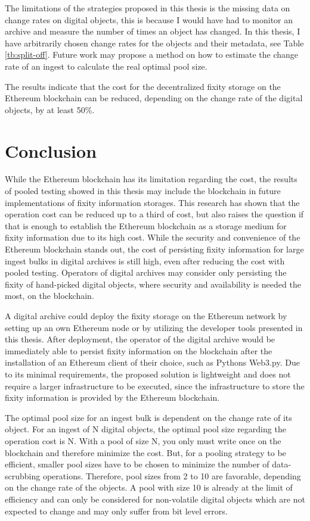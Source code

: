\documentclass[final]{vutinfth}
\begin{document}
The limitations of the strategies proposed in this thesis is the missing data on change rates on digital objects, this is because I would have had to monitor an archive and measure the number of times an object has changed. In this thesis, I have arbitrarily chosen change rates for the objects and their metadata, see Table \ref{tb:split-off}. Future work may propose a method on how to estimate the change rate of an ingest to calculate the real optimal pool size.

The results indicate that the cost for the decentralized fixity storage on the Ethereum blockchain can be reduced, depending on the change rate of the digital objects, by at least 50\%. \chapter{Conclusion}
While the Ethereum blockchain has its limitation regarding the cost, the results of pooled testing showed in this thesis may include the blockchain in future implementations of fixity information storages. This research has shown that the operation cost can be reduced up to a third of cost, but also raises the question if that is enough to establish the Ethereum blockchain as a storage medium for fixity information due to its high cost. While the security and convenience of the Ethereum blockchain stands out, the cost of persisting fixity information for large ingest bulks in digital archives is still high, even after reducing the cost with pooled testing. Operators of digital archives may consider only persisting the fixity of hand-picked digital objects, where security and availability is needed the most, on the blockchain.

A digital archive could deploy the fixity storage on the Ethereum network by setting up an own Ethereum node or by utilizing the developer tools presented in this thesis. After deployment, the operator of the digital archive would be immediately able to persist fixity information on the blockchain after the installation of an Ethereum client of their choice, such as Pythons Web3.py. Due to its minimal requirements, the proposed solution is lightweight and does not require a larger infrastructure to be executed, since the infrastructure to store the fixity information is provided by the Ethereum blockchain.

The optimal pool size for an ingest bulk is dependent on the change rate of its object. For an ingest of N digital objects, the optimal pool size regarding the operation cost is N. With a pool of size N, you only must write once on the blockchain and therefore minimize the cost. But, for a pooling strategy to be efficient, smaller pool sizes have to be chosen to minimize the number of data-scrubbing operations. Therefore, pool sizes from 2 to 10 are favorable, depending on the change rate of the objects. A pool with size 10 is already at the limit of efficiency and can only be considered for non-volatile digital objects which are not expected to change and may only suffer from bit level errors.
\end{document}
